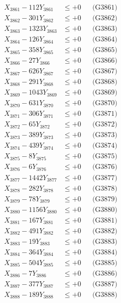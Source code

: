 \documentclass[a4paper,10pt]{article}
\begin{document}
{\begin{align}
\allowbreak
X_{3861} - 112Y_{3861} &\leq +0 && \text{(G3861)} \\
X_{3862} - 301Y_{3862} &\leq +0 && \text{(G3862)} \\
X_{3863} - 1323Y_{3863} &\leq +0 && \text{(G3863)} \\
X_{3864} - 126Y_{3864} &\leq +0 && \text{(G3864)} \\
X_{3865} - 358Y_{3865} &\leq +0 && \text{(G3865)} \\
X_{3866} - 27Y_{3866} &\leq +0 && \text{(G3866)} \\
X_{3867} - 626Y_{3867} &\leq +0 && \text{(G3867)} \\
X_{3868} - 291Y_{3868} &\leq +0 && \text{(G3868)} \\
X_{3869} - 1043Y_{3869} &\leq +0 && \text{(G3869)} \\
X_{3870} - 631Y_{3870} &\leq +0 && \text{(G3870)} \\
\allowbreak
X_{3871} - 306Y_{3871} &\leq +0 && \text{(G3871)} \\
X_{3872} - 65Y_{3872} &\leq +0 && \text{(G3872)} \\
X_{3873} - 389Y_{3873} &\leq +0 && \text{(G3873)} \\
X_{3874} - 439Y_{3874} &\leq +0 && \text{(G3874)} \\
X_{3875} - 8Y_{3875} &\leq +0 && \text{(G3875)} \\
X_{3876} - 6Y_{3876} &\leq +0 && \text{(G3876)} \\
X_{3877} - 1442Y_{3877} &\leq +0 && \text{(G3877)} \\
X_{3878} - 282Y_{3878} &\leq +0 && \text{(G3878)} \\
X_{3879} - 78Y_{3879} &\leq +0 && \text{(G3879)} \\
X_{3880} - 1156Y_{3880} &\leq +0 && \text{(G3880)} \\
\allowbreak
X_{3881} - 167Y_{3881} &\leq +0 && \text{(G3881)} \\
X_{3882} - 491Y_{3882} &\leq +0 && \text{(G3882)} \\
X_{3883} - 19Y_{3883} &\leq +0 && \text{(G3883)} \\
X_{3884} - 364Y_{3884} &\leq +0 && \text{(G3884)} \\
X_{3885} - 504Y_{3885} &\leq +0 && \text{(G3885)} \\
X_{3886} - 7Y_{3886} &\leq +0 && \text{(G3886)} \\
X_{3887} - 377Y_{3887} &\leq +0 && \text{(G3887)} \\
X_{3888} - 189Y_{3888} &\leq +0 && \text{(G3888)} \\

\end{align}}
\end{document}

